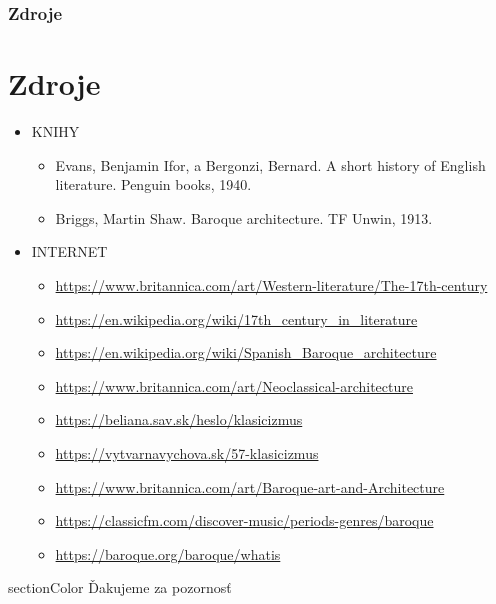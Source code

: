 \documentclass[dvipsnames]{beamer}
\begin{document}
\begin{frame}
	\frametitle{Zdroje}
	\section{Zdroje}
	\begin{itemize}
		\large \item KNIHY
		\begin{itemize}\tiny
			\item Evans, Benjamin Ifor, a Bergonzi, Bernard. A short history of English literature. Penguin books, 1940.
			\item Briggs, Martin Shaw. Baroque architecture. TF Unwin, 1913.
		\end{itemize}
		\large \item INTERNET
		\begin{itemize}\tiny
			
			\item   \url{https://www.britannica.com/art/Western-literature/The-17th-century}%
			\item   \url{https://en.wikipedia.org/wiki/17th\_century\_in\_literature}%
			\item	\url{https://en.wikipedia.org/wiki/Spanish\_Baroque\_architecture}

			\item   \url{https://www.britannica.com/art/Neoclassical-architecture}
			\item   \url{https://beliana.sav.sk/heslo/klasicizmus}
			\item   \url{https://vytvarnavychova.sk/57-klasicizmus}
			\item   \url{https://www.britannica.com/art/Baroque-art-and-Architecture}
			\item   \url{https://classicfm.com/discover-music/periods-genres/baroque}
			\item   \url{https://baroque.org/baroque/whatis}
		\end{itemize}
	\end{itemize}
\end{frame}
\begin{frame}
    \begin{beamercolorbox}[sep=12pt,center]{sectionColor}%
        Ďakujeme za pozornosť\par
    \end{beamercolorbox}
\end{frame}
\end{document}
